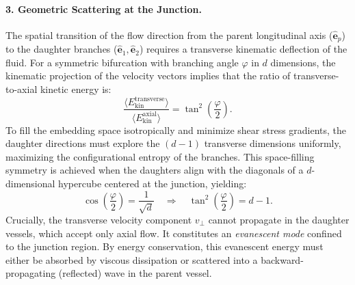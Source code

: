 \documentclass[11pt,a4paper]{article}
\theoremstyle{remark}
\begin{document}
\paragraph{3. Geometric Scattering at the Junction.}
The spatial transition of the flow direction from the parent longitudinal axis
($\hat{\mathbf{e}}_p$) to the daughter branches ($\hat{\mathbf{e}}_1,
\hat{\mathbf{e}}_2$) requires a transverse kinematic deflection of the fluid.
For a symmetric bifurcation with branching angle $\varphi$ in $d$ dimensions,
the kinematic projection of the velocity vectors implies that the ratio of
transverse-to-axial kinetic energy is:
\begin{equation}\label{eq:kinetic_ratio_supp}
    \frac{\langle E_{\mathrm{kin}}^{\mathrm{transverse}} \rangle}{\langle E_{\mathrm{kin}}^{\mathrm{axial}} \rangle} = \tan^2\left(\frac{\varphi}{2}\right).
\end{equation}
To fill the embedding space isotropically and minimize shear stress gradients,
the daughter directions must explore the $(d-1)$ transverse dimensions
uniformly, maximizing the configurational entropy of the branches. This
space-filling symmetry is achieved when the daughters align with the diagonals
of a $d$-dimensional hypercube centered at the junction, yielding:
\begin{equation}\label{eq:isotropic_entropy_supp}
    \cos\left(\frac{\varphi}{2}\right) = \frac{1}{\sqrt{d}} \quad \Rightarrow \quad \tan^2\left(\frac{\varphi}{2}\right) = d - 1.
\end{equation}
Crucially, the transverse velocity component $v_\perp$ cannot propagate in the
daughter vessels, which accept only axial flow. It constitutes an
\emph{evanescent mode} confined to the junction region. By energy conservation,
this evanescent energy must either be absorbed by viscous dissipation or
scattered into a backward-propagating (reflected) wave in the parent vessel.
\end{document}
